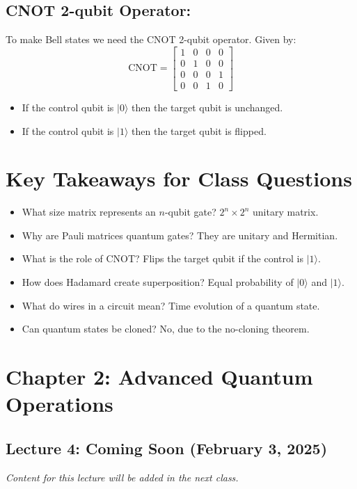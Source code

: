 \documentclass{article}
\begin{document}
\subsection{CNOT 2-qubit Operator:}
To make Bell states we need the CNOT 2-qubit operator. Given by:
\[
\text{CNOT} = \begin{bmatrix} 1 & 0 & 0 & 0 \\ 0 & 1 & 0 & 0 \\ 0 & 0 & 0 & 1 \\ 0 & 0 & 1 & 0 \end{bmatrix}
\]
\begin{itemize}
    \item If the control qubit is \(|0\rangle\) then the target qubit is unchanged.
    \item If the control qubit is \(|1\rangle\) then the target qubit is flipped.
\end{itemize}


\section{Key Takeaways for Class Questions}
\begin{itemize}
    \item What size matrix represents an \(n\)-qubit gate? \(2^n \times 2^n\) unitary matrix.
    \item Why are Pauli matrices quantum gates? They are unitary and Hermitian.
    \item What is the role of CNOT? Flips the target qubit if the control is \(|1\rangle\).
    \item How does Hadamard create superposition? Equal probability of \(|0\rangle\) and \(|1\rangle\).
    \item What do wires in a circuit mean? Time evolution of a quantum state.
    \item Can quantum states be cloned? No, due to the no-cloning theorem.
\end{itemize}

\newpage
\section*{Chapter 2: Advanced Quantum Operations}
\subsection*{Lecture 4: Coming Soon (February 3, 2025)}

\emph{Content for this lecture will be added in the next class.}
\end{document}

